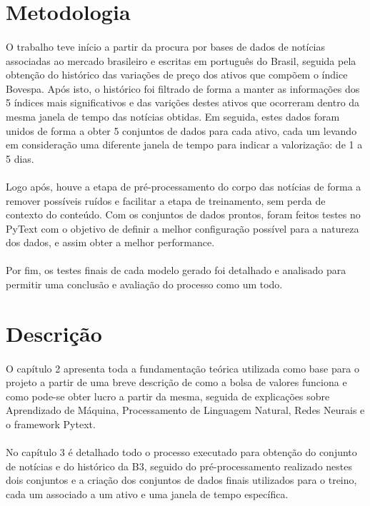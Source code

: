 \documentclass[grad,numbers]{coppe}
\begin{document}
		\section{Metodologia}
			\paragraph{}O trabalho teve início a partir da procura por bases de dados de notícias associadas ao mercado brasileiro e escritas em português do Brasil, seguida pela obtenção do histórico das variações de preço dos ativos que compõem o índice Bovespa. Após isto, o histórico foi filtrado de forma a manter as informações dos 5 índices mais significativos e das varições destes ativos que ocorreram dentro da mesma janela de tempo das notícias obtidas. Em seguida, estes dados foram unidos de forma a obter 5 conjuntos de dados para cada ativo, cada um levando em consideração uma diferente janela de tempo para indicar a valorização: de 1 a 5 dias.
			\paragraph{}Logo após, houve a etapa de pré-processamento do corpo das notícias de forma a remover possíveis ruídos e facilitar a etapa de treinamento, sem perda de contexto do conteúdo. Com os conjuntos de dados prontos, foram feitos testes no PyText com o objetivo de definir a melhor configuração possível para a natureza dos dados, e assim obter a melhor performance.
			\paragraph{}Por fim, os testes finais de cada modelo gerado foi detalhado e analisado para permitir uma conclusão e avaliação do processo como um todo.

		\section{Descrição}
			\paragraph{}O capítulo 2 apresenta toda a fundamentação teórica utilizada como base para o projeto a partir de uma breve descrição de como a bolsa de valores funciona e como pode-se obter lucro a partir da mesma, seguida de explicações sobre Aprendizado de Máquina, Processamento de Linguagem Natural, Redes Neurais e o framework Pytext.
			\paragraph{}No capítulo 3 é detalhado todo o processo executado para obtenção do conjunto de notícias e do histórico da B3, seguido do pré-processamento realizado nestes dois conjuntos e a criação dos conjuntos de dados finais utilizados para o treino, cada um associado a um ativo e uma janela de tempo específica.
\end{document}

